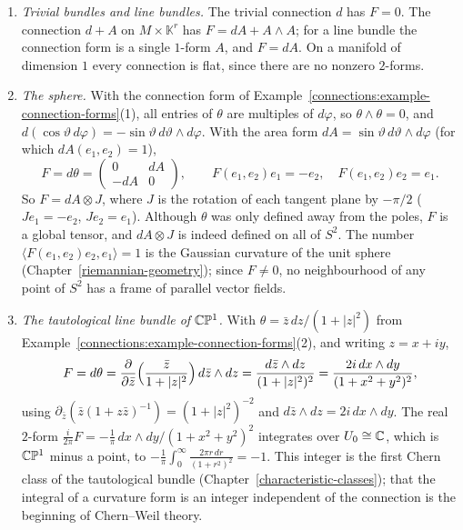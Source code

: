 \begin{example}\label{connections:example-curvature-computations}
\begin{enumerate}
\item \emph{Trivial bundles and line bundles.} The trivial connection $d$ has $F = 0$. The connection $d + A$ on $M \times \mathbb{K}^r$ has $F = dA + A \wedge A$; for a line bundle
the connection form is a single $1$-form $A$, and $F = dA$. On a manifold of dimension $1$ every connection is flat, since there are no nonzero $2$-forms.
\item \emph{The sphere.} With the connection form of Example~\ref{connections:example-connection-forms}(1), all entries of $\theta$ are multiples of $d\varphi$, so $\theta \wedge \theta = 0$, and
$d(\cos\vartheta\,d\varphi) = -\sin\vartheta\,d\vartheta \wedge d\varphi$. With the area form $dA = \sin\vartheta\,d\vartheta \wedge d\varphi$ (for which $dA(e_1, e_2) = 1$),
\[
F = d\theta = \begin{pmatrix} 0 & dA\\ -dA & 0\end{pmatrix}, \qquad F(e_1, e_2)e_1 = -e_2, \quad F(e_1, e_2)e_2 = e_1 .
\]
So $F = dA \otimes J$, where $J$ is the rotation of each tangent plane by $-\pi/2$ ($Je_1 = -e_2$, $Je_2 = e_1$). Although $\theta$ was only defined away from the poles, $F$ is
a global tensor, and $dA \otimes J$ is indeed defined on all of $S^2$. The number $\langle F(e_1, e_2)e_2, e_1\rangle = 1$ is the Gaussian curvature of the unit sphere
(Chapter~\ref{riemannian-geometry}); since $F \neq 0$, no neighbourhood of any point of $S^2$ has a frame of parallel vector fields.
\item \emph{The tautological line bundle of $\mathbb{C}\mathbb{P}^1$.} With $\theta = \bar z\,dz/(1 + |z|^2)$ from Example~\ref{connections:example-connection-forms}(2), and writing $z = x + iy$,
\[
F = d\theta = \frac{\partial}{\partial\bar z}\Bigl(\frac{\bar z}{1 + |z|^2}\Bigr)\,d\bar z \wedge dz = \frac{d\bar z \wedge dz}{(1 + |z|^2)^2} = \frac{2i\,dx \wedge dy}{(1 + x^2 + y^2)^2},
\]
using $\partial_{\bar z}(\bar z(1 + z\bar z)^{-1}) = (1 + |z|^2)^{-2}$ and $d\bar z \wedge dz = 2i\,dx \wedge dy$. The real $2$-form $\frac{i}{2\pi}F = -\frac1\pi\,dx \wedge dy/(1 + x^2 + y^2)^2$
integrates over $U_0 \cong \mathbb{C}$, which is $\mathbb{C}\mathbb{P}^1$ minus a point, to $-\frac1\pi\int_0^\infty\frac{2\pi r\,dr}{(1 + r^2)^2} = -1$. This integer is the first Chern class of the
tautological bundle (Chapter~\ref{characteristic-classes}); that the integral of a curvature form is an integer independent of the connection is the beginning of Chern--Weil
theory.
\end{enumerate}
\end{example}

